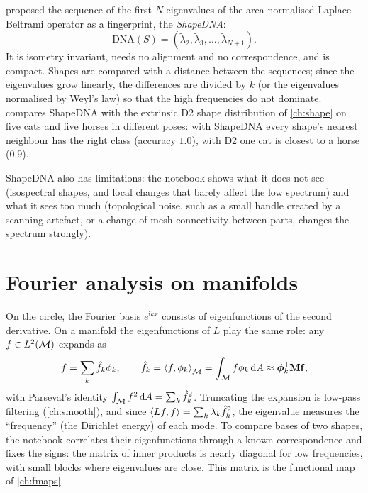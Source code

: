 \citet{Reuter2006} proposed the sequence of the first $N$ eigenvalues of the area-normalised
Laplace--Beltrami operator as a fingerprint, the \emph{ShapeDNA}:
\begin{equation}
\mathrm{DNA}(S)=(\tilde\lambda_2,\tilde\lambda_3,\dots,\tilde\lambda_{N+1}) .
\end{equation}
It is isometry invariant, needs no alignment and no correspondence, and is compact. Shapes are
compared with a distance between the sequences; since the eigenvalues grow linearly, the differences
are divided by $k$ (or the eigenvalues normalised by Weyl's law) so that the high frequencies do not
dominate.  compares ShapeDNA with the extrinsic D2 shape distribution of
\cref{ch:shape} on five cats and five horses in different poses: with ShapeDNA every shape's nearest
neighbour has the right class (accuracy $1.0$), with D2 one cat is closest to a horse ($0.9$).


ShapeDNA also has limitations: the notebook shows what it does not see (isospectral shapes, and
local changes that barely affect the low spectrum) and what it sees too much (topological noise, such
as a small handle created by a scanning artefact, or a change of mesh connectivity between parts,
changes the spectrum strongly).

\section{Fourier analysis on manifolds}

On the circle, the Fourier basis $e^{\mathrm ikx}$ consists of eigenfunctions of the second derivative.
On a manifold the eigenfunctions of $L$ play the same role: any $f\in L^2(\mathcal{M})$ expands as
\begin{equation}
f=\sum_k\hat f_k\phi_k,\qquad \hat f_k=\left\langle f,\phi_k\right\rangle_{\mathcal{M}}=\int_{\mathcal{M}} f\phi_k\,\mathrm{d} A\approx\boldsymbol{\phi}_k^{\mathsf{T}}\mathbf{M}\mathbf{f} ,
\end{equation}
with Parseval's identity $\int_{\mathcal{M}} f^2\,\mathrm{d} A=\sum_k\hat f_k^2$. Truncating the expansion is low-pass
filtering (\cref{ch:smooth}), and since $\left\langle Lf,f\right\rangle=\sum_k\lambda_k\hat f_k^2$, the eigenvalue
measures the ``frequency'' (the Dirichlet energy) of each mode. To compare bases of two shapes, the
notebook correlates their eigenfunctions through a known correspondence and fixes the signs: the
matrix of inner products is nearly diagonal for low frequencies, with small blocks where eigenvalues
are close. This matrix is the functional map of \cref{ch:fmaps}.

